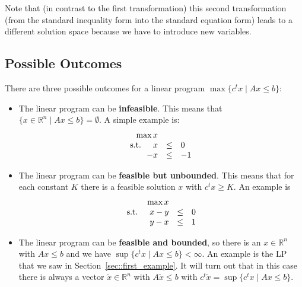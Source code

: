 \documentclass[12pt, showidx, twoside]{article}
\def\R{\mathbb{R}}
\def\hi{\bf}
\begin{document}
Note that (in contrast to the first transformation)
this second transformation (from the standard inequality form
into the standard equation form)
leads to a different solution
space because we have to introduce new variables.






\subsection{Possible Outcomes}

There are three possible outcomes for a linear program
$\max\{c^t x \mid Ax \leq b \}$:

\begin{itemize}
\item The linear program can be {\hi infeasible}.
This means that $\{x \in \R^n \mid Ax \leq b\} = \emptyset$.
A simple example is:
\begin{equation}
\begin{array}{rcl}
\max x & & \\
 \mbox{s.t. \quad} x & \leq & 0\\
                  -x & \leq & -1
\end{array}
\end{equation}
\item The linear program can be {\hi feasible but unbounded}.
This means that for each constant $K$ there is a 
feasible solution $x$ with $c^t x \geq K$. An example is
\begin{equation}
\begin{array}{rcl}
\max x & & \\
 \mbox{s.t. \quad} x - y & \leq & 0\\
                   y - x & \leq & 1
\end{array}
\end{equation}
\item The linear program can be {\hi feasible and bounded},
so there is an $x \in \R^n$ with $Ax \leq b$ and we have
$\sup\{c^t x \mid Ax \leq b \} < \infty$.
An example is the LP that we saw in Section~\ref{sec::first_example}.
It will turn out that in this case there is always a vector
$\tilde x \in \R^n$ with $A \tilde x \leq b$ with
$c^t \tilde x = \sup\{c^t x \mid Ax \leq b \}$.
\end{itemize}
\end{document}
